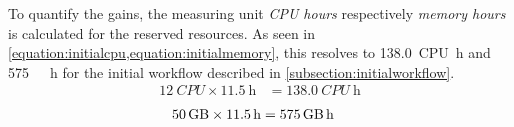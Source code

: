 To quantify the gains, the measuring unit \textit{CPU hours} respectively \textit{memory hours} is calculated for the reserved resources. As seen in \cref{equation:initialcpu,equation:initialmemory}, this resolves to \SI{138.0}{CPU~\hour} and \SI{575}{\giga\byte~\hour} for the initial workflow described in \cref{subsection:initialworkflow}.
\begin{equation}\label{equation:initialcpu}
    \begin{aligned}
        \SI{12}{CPU}\times\SI{11.5}{\hour} &= \SI{138.0}{CPU~\hour}
    \end{aligned}
\end{equation}
\begin{equation}\label{equation:initialmemory}
    \begin{aligned}
        \SI{50}{\giga\byte}\times\SI{11.5}{\hour} &= \SI{575}{\giga\byte~\hour}
    \end{aligned}
\end{equation}

